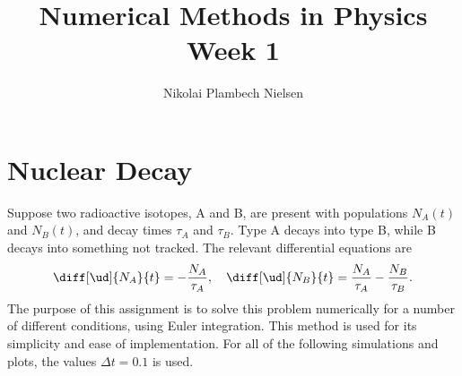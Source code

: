 \documentclass[a4paper,10pt]{article} 	%
\title{Numerical Methods in Physics Week 1}
\author{Nikolai Plambech Nielsen}
\date{}
\numberwithin{equation}{section}
\begin{document}
	\maketitle
	\section{Nuclear Decay}
	Suppose  two radioactive isotopes, A and B, are present with populations $ N_A(t) $ and $ N_B(t) $, and decay times $ \tau_A $  and $ \tau_B $. Type A decays into type B, while B decays into something not tracked. The relevant differential equations are
	\begin{equation}
		\diff[\ud]{N_A}{t} = - \frac{N_A}{\tau_A}, \quad \diff[\ud]{N_B}{t} = \frac{N_A}{\tau_A} - \frac{N_B}{\tau_B}.
	\end{equation}
	The purpose of this assignment is to solve this problem numerically for a number of different conditions, using Euler integration. This method is used for its simplicity and ease of implementation. For all of the following simulations and plots, the values $ \Delta t = 0.1 $ is used.
	
\end{document}

